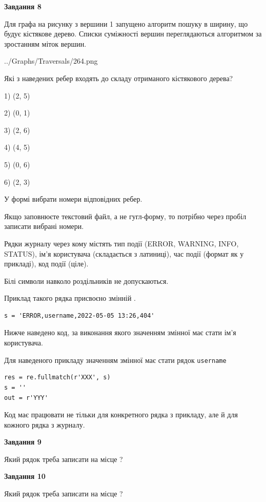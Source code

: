 \documentclass[12pt, ukrainian]{article}
\def\code#1{\Verb!#1!}
\begin{document}
{\begin {large}
{\begin {center}\textbf{Завдання 8}\end {center}}\par
Для графа на рисунку з вершини 1 запущено алгоритм пошуку в ширину, що будує кістякове дерево. Списки суміжності вершин переглядаються алгоритмом за зростанням міток вершин.\par
\begin{center}
	{../Graphs/Traversals/264.png}
\end{center}
\par Які з наведених ребер входять до складу отриманого кістякового дерева?\par
1) (2, 5)\par
2) (0, 1)\par
3) (2, 6)\par
4) (4, 5)\par
5) (0, 6)\par
6) (2, 3)\par
{\vskip 15pt} У формі вибрати номери відповідних ребер.


Якщо заповнюєте текстовий файл, а не гугл-форму, то потрібно через пробіл записа\-ти вибрані номери.\par
\newpage


Рядки журналу через кому містять тип події (ERROR, WARNING, INFO, STATUS), ім'я користувача (складається з латиниці), час події (фор\-мат як у прикладі), код події (ціле).

Білі символи навколо роздільників не допускаються.

Приклад такого рядка присвоєно змінній .



\begin{verbatim}
s = 'ERROR,username,2022-05-05 13:26,404'
\end{verbatim}


Нижче наведено код, за виконання якого значенням змінної  має стати ім'я користувача.

Для наведеного прикладу значенням змінної  має стати рядок \code{username}



\begin{verbatim}
res = re.fullmatch(r'XXX', s)
s = ''
out = r'YYY'
\end{verbatim}


Код має працювати не тільки для конкретного рядка з прикладу, але й для кожного рядка з журналу.

{\begin {center}\textbf{Завдання 9}\end {center}}\par
Який рядок треба записати на місце  ?\par
\vspace{5mm}


{\begin {center}\textbf{Завдання 10}\end {center}}\par
Який рядок треба записати на місце  ?\par


\newpage


\end {large}}
\end{document}
